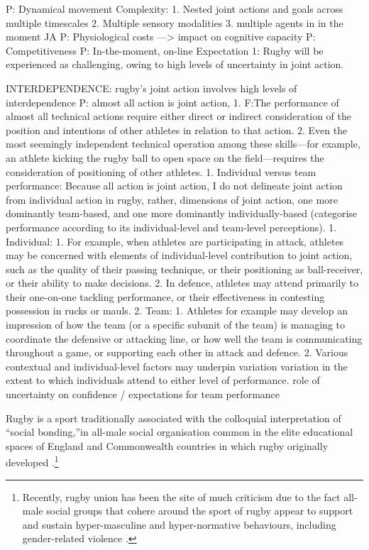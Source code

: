 \begin{CJK}{UTF8}{gbsn}
   P: Dynamical movement Complexity:
      1. Nested joint actions and goals across multiple timescales
      2. Multiple sensory modalities
      3. multiple agents in in the moment JA
   P: Physiological costs —> impact on cognitive capacity
   P: Competitiveness
   P: In-the-moment, on-line
   Expectation 1: Rugby will be experienced as challenging, owing to high levels of uncertainty in joint action.


INTERDEPENDENCE: rugby’s joint action involves high levels of interdependence
     P: almost all action is joint action,
        1. F:The performance of almost all technical actions require either direct or indirect consideration of the position and intentions of other athletes in relation to that action.
        2. Even the most seemingly independent technical operation among these skills---for example, an athlete kicking the rugby ball to open space on the field---requires the consideration of positioning of other athletes.
            1. Individual versus team performance:  Because all action is joint action, I do not delineate joint action from individual action in rugby, rather, dimensions of joint action, one more dominantly team-based, and one more dominantly individually-based (categorise performance according to its individual-level and team-level perceptions).
            1. Individual:
                1. For example, when athletes are participating in attack, athletes may be concerned with elements of individual-level contribution to joint action, such as the quality of their passing technique, or their positioning as ball-receiver, or their ability to make decisions.
                2.  In defence, athletes may attend primarily to their one-on-one tackling performance, or their effectiveness in contesting possession in rucks or mauls.
            2. Team:
                1. Athletes for example may develop an impression of how the team (or a specific subunit of the team) is managing to coordinate the defensive or attacking line, or how well the team is communicating throughout a game, or supporting each other in attack and defence.
                2. Various contextual and individual-level factors may underpin variation variation in the extent to which individuals attend to either level of performance. role of uncertainty on confidence / expectations for team performance


  Rugby is a sport traditionally associated with the colloquial interpretation of ``social bonding,''in all-male social organisation common in the elite educational spaces of England and Commonwealth countries in which rugby originally developed \citep{Dunning2005,Richards2007,Collins2008}.\footnote{Recently, rugby union has been the site of much criticism due to the fact all-male social groups that cohere around the sport of rugby appear to support and sustain hyper-masculine and hyper-normative behaviours, including gender-related violence \citep{Cosslett2014}.}


\end{CJK}

